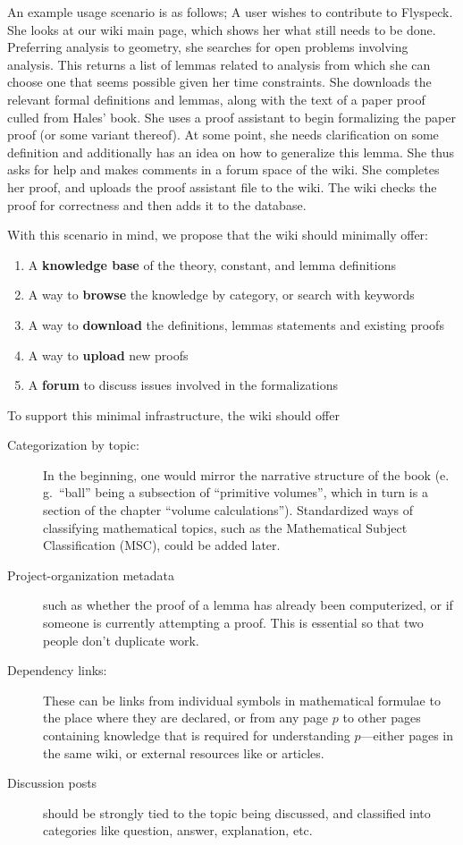 An example usage scenario is as follows; A user wishes to contribute to
Flyspeck.  She looks at our wiki main page, which shows her what still needs to
be done.  Preferring analysis to geometry, she searches for open problems
involving analysis.  This returns a list of lemmas related to analysis from
which she can choose one that seems possible given her time constraints. She
downloads the relevant formal definitions and lemmas, along with the text of a
paper proof culled from Hales' book.  She uses a proof assistant to begin
formalizing the paper proof (or some variant thereof).  At some point, she needs
clarification on some definition and additionally has an idea on how to
generalize this lemma.  She thus asks for help and makes comments in a forum
space of the wiki.  She completes her proof, and uploads the proof assistant
file to the wiki.  The wiki checks the proof for correctness and then adds it to
the database.

With this scenario in mind, we propose that the wiki should minimally offer: 

\begin{enumerate} 
\item A \textbf{knowledge base} of the theory, constant, and lemma definitions 
\item A way to \textbf{browse} the knowledge by category, or search with keywords 
\item A way to \textbf{download} the definitions, lemmas statements and existing
  proofs
\item A way to \textbf{upload} new proofs 
\item A \textbf{forum} to discuss issues involved in the formalizations 
\end{enumerate} 

To support this minimal infrastructure, the wiki should offer 

\begin{description}
\item[Categorization by topic:] In the beginning, one would mirror the narrative structure
  of the book (e.\,g.\ ``ball'' being a subsection of ``primitive volumes'', which in turn
  is a section of the chapter ``volume calculations'').  Standardized ways of classifying
  mathematical topics, such as the Mathematical Subject Classification
  (MSC)\cite{AMS:MSC2000}, could be added later.
\item[Project-organization metadata] such as whether the proof
  of a lemma has already been computerized, or if someone is currently 
  attempting a proof.  This is essential so that two people don't duplicate
  work.
\item[Dependency links:] These can be links from individual symbols in
  mathematical formulae to the place where they are declared, or from any page
  $p$ to other pages containing knowledge that is required for understanding $p$---either pages in the same wiki, or external resources like
   or  articles.
\item[Discussion posts] should be strongly tied to the topic being discussed,
  and classified into categories like question, answer, explanation, etc.
\end{description}

